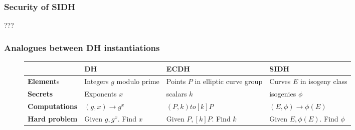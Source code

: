 \documentclass{beamer}
\begin{document}
\begin{frame}
\frametitle{Security of SIDH}

???
\end{frame}

\begin{frame}
\frametitle{Analogues between DH instantiations}
\begin{figure}[h]
	\begin{center}
		\begin{tabular}{| m{2.3cm} | m{2.5cm} m{2.5cm} m{2.5cm} |}
			\hline
			~ & DH & ECDH & SIDH\\
			\hline
			\textbf{Element}s & Integers $g$ modulo prime & Points $P$ in elliptic curve group & Curves $E$ in isogeny class\\
			\hline
			\textbf{Secrets} & Exponents $x$ & scalars $k$ & isogenies $\phi$ \\
			\hline
			\textbf{Computations} & $(g, x) \to g^x$ & $(P, k) to [k]P$ & $(E, \phi) \to \phi(E)$\\
			\hline
			\textbf{Hard problem} & Given $g, g^x$. Find $x$ & Given $P,[k]P$. Find $k$ & Given $E, \phi(E)$. Find $\phi$\\
			\hline 
		\end{tabular}
	\end{center}
\end{figure}
\end{frame}
\end{document}
